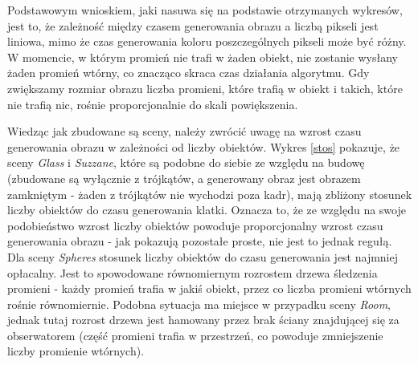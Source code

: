 Podstawowym wnioskiem, jaki nasuwa się na podstawie otrzymanych wykresów, jest to, że zależność między czasem generowania obrazu a liczbą pikseli jest liniowa, mimo że czas generowania koloru poszczególnych pikseli może być różny. W momencie, w którym promień nie trafi w żaden obiekt, nie zostanie wysłany żaden promień wtórny, co znacząco skraca czas działania algorytmu. Gdy zwiększamy rozmiar obrazu liczba promieni, które trafią w obiekt i takich, które nie trafią nic, rośnie proporcjonalnie do skali powiększenia.

Wiedząc jak zbudowane są sceny, należy zwrócić uwagę na wzrost czasu generowania obrazu w zależności od liczby obiektów. Wykres \ref{stos} pokazuje, że sceny \emph{Glass} i \emph{Suzzane}, które są podobne do siebie ze względu na budowę (zbudowane są wyłącznie z trójkątów, a generowany obraz jest obrazem zamkniętym - żaden z trójkątów nie wychodzi poza kadr), mają zbliżony stosunek liczby obiektów do czasu generowania klatki. Oznacza to, że ze względu na swoje podobieństwo wzrost liczby obiektów powoduje proporcjonalny wzrost czasu generowania obrazu - jak pokazują pozostałe proste, nie jest to jednak regułą. Dla sceny \emph{Spheres} stosunek liczby obiektów do czasu generowania jest najmniej opłacalny. Jest to spowodowane równomiernym rozrostem drzewa śledzenia promieni - każdy promień trafia w jakiś obiekt, przez co liczba promieni wtórnych rośnie równomiernie. Podobna sytuacja ma miejsce w przypadku sceny \emph{Room}, jednak tutaj rozrost drzewa jest hamowany przez brak ściany znajdującej się za obserwatorem (część promieni trafia w przestrzeń, co powoduje zmniejszenie liczby promienie wtórnych).

